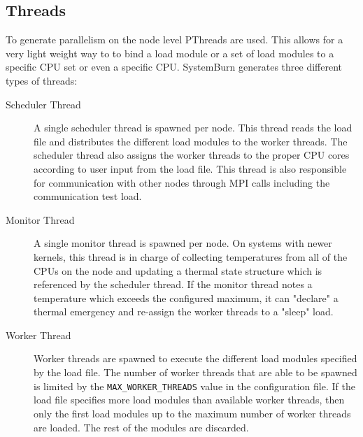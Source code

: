 \subsection{Threads}

To generate parallelism on the node level PThreads are used. This allows
for a very light weight way to to bind a load module or a set of load
modules to a specific CPU set or even a specific CPU. SystemBurn generates
three different types of threads:

\begin{description}

	\item[Scheduler Thread] A single scheduler thread is spawned
	per node. This thread reads the load file and distributes the
	different load modules to the worker threads. The scheduler
	thread also assigns the worker threads to the proper CPU cores
	according to user input from the load file. This thread is also
	responsible for communication with other nodes through MPI calls
	including the communication test load.

	\item[Monitor Thread] A single monitor thread is spawned per
	node. On systems with newer kernels, this thread is in charge
	of collecting temperatures from all of the CPUs on the node
	and updating a thermal state structure which is referenced by
	the scheduler thread. If the monitor thread notes a temperature
	which exceeds the configured maximum, it can "declare" a thermal
	emergency and re-assign the worker threads to a "sleep" load.

	\item[Worker Thread] Worker threads are spawned to execute the
	different load modules specified by the load file. The number
	of worker threads that are able to be spawned is limited by the
	\verb!MAX_WORKER_THREADS! value in the configuration file. If
	the load file specifies more load modules than available worker
	threads, then only the first load modules up to the maximum
	number of worker threads are loaded. The rest of the modules
	are discarded.

\end{description}
